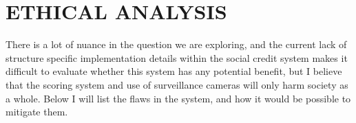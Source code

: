 \documentclass[letterpaper, 10 pt, conference]{ieeeconf}  %
\begin{document}



   

\section{ETHICAL ANALYSIS}
There is a lot of nuance in the question we are exploring, and the current lack of structure specific implementation details within the social credit system makes it difficult to evaluate whether this system has any potential benefit, but I believe that the scoring system and use of surveillance cameras will only harm society as a whole. Below I will list the flaws in the system, and how it would be possible to mitigate them.
\end{document}
